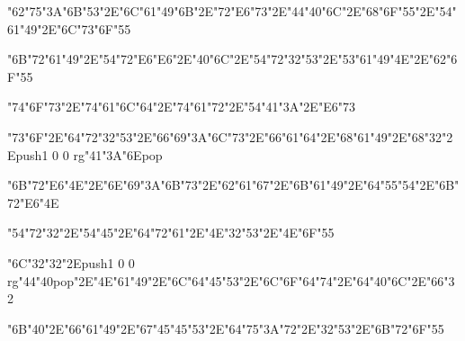 \centerline{\ipa\char"62\ipa\char"75\ipa\char"3A\ipa\char"6B\ipa\char"53\ipa\char"2E\ipa\char"6C\ipa\char"61\ipa\char"49\ipa\char"6B\ipa\char"2E\ipa\char"72\ipa\char"E6\ipa\char"73\ipa\char"2E\ipa\char"44\ipa\char"40\ipa\char"6C\ipa\char"2E\ipa\char"68\ipa\char"6F\ipa\char"55\ipa\char"2E\ipa\char"54\ipa\char"61\ipa\char"49\ipa\char"2E\ipa\char"6C\ipa\char"73\ipa\char"6F\ipa\char"55}\bigskip
\centerline{\ipa\char"6B\ipa\char"72\ipa\char"61\ipa\char"49\ipa\char"2E\ipa\char"54\ipa\char"72\ipa\char"E6\ipa\char"E6\ipa\char"2E\ipa\char"40\ipa\char"6C\ipa\char"2E\ipa\char"54\ipa\char"72\ipa\char"32\ipa\char"53\ipa\char"2E\ipa\char"53\ipa\char"61\ipa\char"49\ipa\char"4E\ipa\char"2E\ipa\char"62\ipa\char"6F\ipa\char"55}
\vfill\eject
\null\vfill
\centerline{\ipa\char"74\ipa\char"6F\ipa\char"73\ipa\char"2E\ipa\char"74\ipa\char"61\ipa\char"6C\ipa\char"64\ipa\char"2E\ipa\char"74\ipa\char"61\ipa\char"72\ipa\char"2E\ipa\char"54\ipa\char"41\ipa\char"3A\ipa\char"2E\ipa\char"E6\ipa\char"73}\bigskip
\centerline{\ipa\char"73\ipa\char"6F\ipa\char"2E\ipa\char"64\ipa\char"72\ipa\char"32\ipa\char"53\ipa\char"2E\ipa\char"66\ipa\char"69\ipa\char"3A\ipa\char"6C\ipa\char"73\ipa\char"2E\ipa\char"66\ipa\char"61\ipa\char"64\ipa\char"2E\ipa\char"68\ipa\char"61\ipa\char"49\ipa\char"2E\ipa\char"68\ipa\char"32\ipa\char"2E\pdfcolorstack\match push{1 0 0 rg}\ipa\char"41\ipa\char"3A\ipa\char"6E\pdfcolorstack\match pop{}}\bigskip
\centerline{\ipa\char"6B\ipa\char"72\ipa\char"E6\ipa\char"4E\ipa\char"2E\ipa\char"6E\ipa\char"69\ipa\char"3A\ipa\char"6B\ipa\char"73\ipa\char"2E\ipa\char"62\ipa\char"61\ipa\char"67\ipa\char"2E\ipa\char"6B\ipa\char"61\ipa\char"49\ipa\char"2E\ipa\char"64\ipa\char"55\ipa\char"54\ipa\char"2E\ipa\char"6B\ipa\char"72\ipa\char"E6\ipa\char"4E}
\vfill\eject
\null\vfill
\centerline{\ipa\char"54\ipa\char"72\ipa\char"32\ipa\char"2E\ipa\char"54\ipa\char"45\ipa\char"2E\ipa\char"64\ipa\char"72\ipa\char"61\ipa\char"2E\ipa\char"4E\ipa\char"32\ipa\char"53\ipa\char"2E\ipa\char"4E\ipa\char"6F\ipa\char"55}\bigskip
\centerline{\ipa\char"6C\ipa\char"32\ipa\char"32\ipa\char"2E\pdfcolorstack\match push{1 0 0 rg}\ipa\char"44\ipa\char"40\pdfcolorstack\match pop{}\ipa\char"2E\ipa\char"4E\ipa\char"61\ipa\char"49\ipa\char"2E\ipa\char"6C\ipa\char"64\ipa\char"45\ipa\char"53\ipa\char"2E\ipa\char"6C\ipa\char"6F\ipa\char"64\ipa\char"74\ipa\char"2E\ipa\char"64\ipa\char"40\ipa\char"6C\ipa\char"2E\ipa\char"66\ipa\char"32}\bigskip
\centerline{\ipa\char"6B\ipa\char"40\ipa\char"2E\ipa\char"66\ipa\char"61\ipa\char"49\ipa\char"2E\ipa\char"67\ipa\char"45\ipa\char"45\ipa\char"53\ipa\char"2E\ipa\char"64\ipa\char"75\ipa\char"3A\ipa\char"72\ipa\char"2E\ipa\char"32\ipa\char"53\ipa\char"2E\ipa\char"6B\ipa\char"72\ipa\char"6F\ipa\char"55}
